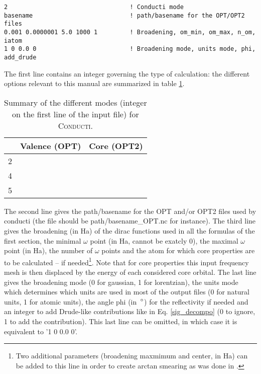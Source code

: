 \documentclass[a4,12pts]{extarticle}
\newcommand{\cmark}{\ding{51}}%
\newcommand{\xmark}{\ding{55}}%
\begin{document}
\begin{verbatim}
2                                  ! Conducti mode
basename                           ! path/basename for the OPT/OPT2 files
0.001 0.0000001 5.0 1000 1         ! Broadening, om_min, om_max, n_om, iatom
1 0 0.0 0                          ! Broadening mode, units mode, phi, add_drude
\end{verbatim}
The first line contains an integer governing the type of calculation: the different options relevant to this manual are summarized in table \ref{table_conducti_mode}.
\begin{table}[h!]
\centering
	\begin{tabular}{l| c c} 
\hline
\hline
 & Valence (OPT) & Core (OPT2) \\
\hline
2 & \cmark & \xmark \\
4 & \cmark & \cmark \\
5 & \xmark & \cmark \\
\hline
\hline
\end{tabular}
\caption{Summary of the different modes (integer on the first line of the input file) for \textsc{Conducti}.} \label{table_conducti_mode}
\end{table}

The second line gives the path/basename for the OPT and/or OPT2 files used by conducti (the file should be path/basename\_OPT.nc for instance). The third line gives the broadening (in Ha) of the dirac functions used in all the formulas of the first section, the minimal $\omega$ point (in Ha, cannot be exatcly 0), the maximal $\omega$ point (in Ha), the number of $\omega$ points and the atom for which core properties are to be calculated -- if needed\footnote{Two additional parameters (broadening maxmimum and center, in Ha) can be added to this line in order to create arctan smearing as was done in \cite{Jourdain2020}.}. Note that for core properties this input frequency mesh is then displaced by the energy of each considered core orbital. The last line gives the broadening mode (0 for gaussian, 1 for lorentzian), the units mode which determines which units are used in most of the output files (0 for natural units, 1 for atomic units), the angle phi (in~$\degree$) for the reflectivity if needed and an integer to add Drude-like contributions like in Eq. \ref{sig_decompo} (0 to ignore, 1 to add the contribution).  This last line can be omitted, in which case it is equivalent to '1 0 0.0 0'.
\end{document}
